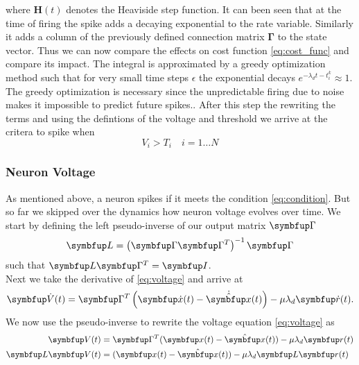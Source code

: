 where $\bm{H}(t)$ denotes the Heaviside step function. It can been seen that at the time of firing the spike adds a decaying exponential to the rate variable. Similarly it adds a column of the previously defined connection matrix $\bm{\Gamma}$ to the state vector. Thus we can now compare the effects on cost function \cref{eq:cost_func} and compare its impact. The integral is approximated by a greedy optimization method such that for very small time steps $\epsilon$ the exponential decays $e^{-\lambda_d t - t_i^k}\approx 1$. The greedy optimization is necessary since the unpredictable firing due to noise makes it impossible to predict future spikes.. After this step the rewriting the terms and using the defintions of the voltage and threshold we arrive at the critera to spike when
\begin{equation}\label{eq:condition}
	V_i> T_i \quad i = 1\dots N
\end{equation}
\subsubsection{Neuron Voltage}
As mentioned above, a neuron spikes if it meets the condition \cref{eq:condition}. But so far we skipped over the dynamics how neuron voltage evolves over time.
We start by defining the left pseudo-inverse of our output matrix $\bmu{\Gamma}$ 
\begin{equation}
	\bmu{L} = \left(\bmu{\Gamma}\bmu{\Gamma}^T\right)^{-1}\bmu{\Gamma}
\end{equation}
such that $\bmu{L}\bmu{\Gamma}^T = \bmu{I}$.\\
Next we take the derivative of \cref{eq:voltage} and arrive at
\begin{equation}\label{eq:voltage_dt}
	\bmu{\dot{V}}(t)=\bmu{\Gamma}^T\left(\bmu{\dot{x}}(t)-\dot{\hat{\bmu{x}}}(t)\right)-\mu \lambda_d \bmu{\dot{r}}(t).
\end{equation}
We now use the pseudo-inverse to rewrite the voltage equation \cref{eq:voltage} as
\begin{equation}\label{eq:voltage_2}
\begin{aligned}
	\bmu{V}(t)&=\bmu{\Gamma}^T(\bmu{x}(t)-\hat{\bmu{x}}(t))-\mu \lambda_d \bmu{r}(t)\\
	\bmu{L}\bmu{V}(t)&=(\bmu{x}(t)-\hat{\bmu{x}}(t))-\mu \lambda_d \bmu{L}\bmu{r}(t)\\
\end{aligned}
\end{equation}

